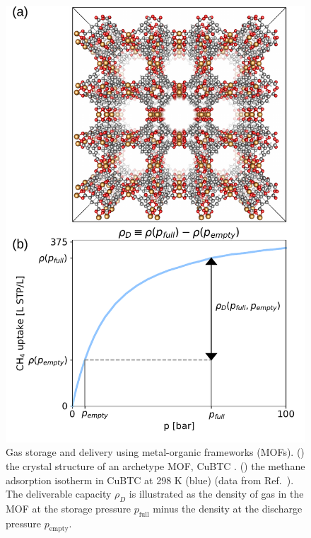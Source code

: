 \documentclass[pre,twocolumn]{revtex4-2}
\newcommand\pfull{\ensuremath{p_{\text{full}}}}
\newcommand\pempty{\ensuremath{p_{\text{empty}}}}
\begin{document}
\begin{figure}
    \centering
    \includegraphics[width=0.8\columnwidth]{Combine_Figure.pdf}
    \begin{minipage}{0.25\textwidth}
    \end{minipage}
    \begin{minipage}{0.25\textwidth}
    \end{minipage}
    
    \caption{\label{fig:fig1} Gas storage and delivery using metal-organic frameworks (MOFs). () the crystal structure of an archetype MOF, CuBTC \cite{chui1999chemically}. () the methane adsorption isotherm in CuBTC \cite{chui1999chemically} at 298 K (blue) (data from Ref.~\cite{mason2014evaluating}). The deliverable capacity $\rho_D$ is illustrated as the density of gas in the MOF at the storage pressure $\pfull$ minus the density at the discharge pressure $\pempty$.}
\end{figure}
\end{document}

